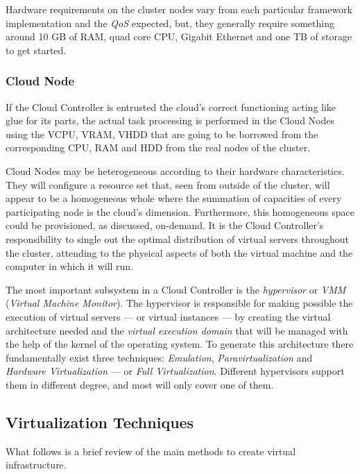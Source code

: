Hardware requirements on the cluster nodes vary from each particular framework implementation and the \emph{QoS} expected, but, they generally require something around 10 GB of RAM, quad core CPU, Gigabit Ethernet and one TB of storage to get started.


\subsubsection{Cloud Node}\label{subsubsec:cloudnode}
\noindent If the Cloud Controller is entrusted the cloud's correct functioning acting like glue for its parts, the actual task processing is performed in the Cloud Nodes using the VCPU, VRAM, VHDD that are going to be borrowed from the corresponding CPU, RAM and HDD from the real nodes of the cluster.

Cloud Nodes may be heterogeneous according to their hardware characteristics. They will configure a resource set that, seen from outside of the cluster, will appear to be a homogeneous whole where the summation of capacities of every participating node is the cloud's dimension. Furthermore, this homogeneous space could be provisioned, as discussed, on-demand. It is the Cloud Controller's responsibility to single out the optimal distribution of virtual servers throughout the cluster, attending to the physical aspects of both the virtual machine and the computer in which it will run.

The most important subsystem in a Cloud Controller is the \emph{hypervisor} or \emph{VMM} (\emph{Virtual Machine Monitor}). The hypervisor is responsible for making possible the execution of virtual servers --- or virtual instances --- by creating the virtual architecture needed and the \emph{virtual execution domain} that will be managed with the help of the kernel of the operating system. To generate this architecture there fundamentally exist three techniques: \emph{Emulation}, \emph{Paravirtualization} and \emph{Hardware Virtualization} --- or \emph{Full Virtualization}. Different hypervisors support them in different degree, and most will only cover one of them.

\subsection{Virtualization Techniques}\label{subsec:tecnicasemu}
\noindent What follows is a brief review of the main methods to create virtual infrastructure.

